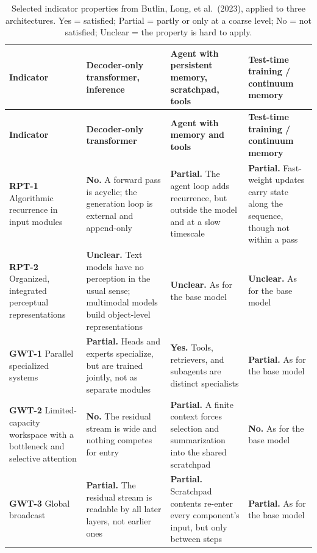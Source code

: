\documentclass[11pt,letterpaper]{article}
\begin{document}
{\footnotesize
\setlength{\tabcolsep}{4pt}
\begin{longtable}{L{2.7cm}L{4.35cm}L{4.35cm}L{4.35cm}}
\caption{Selected indicator properties from Butlin, Long, et al.\ (2023), applied to three architectures. Yes = satisfied; Partial = partly or only at a coarse level; No = not satisfied; Unclear = the property is hard to apply.}\label{tab:indicators}\\
\toprule
\textbf{Indicator} & \textbf{Decoder-only transformer, inference} & \textbf{Agent with persistent memory, scratchpad, tools} & \textbf{Test-time training / continuum memory} \\
\midrule
\endfirsthead
\toprule
\textbf{Indicator} & \textbf{Decoder-only transformer} & \textbf{Agent with memory and tools} & \textbf{Test-time training / continuum memory} \\
\midrule
\endhead
\bottomrule
\endfoot
{}
\textbf{RPT-1} Algorithmic recurrence in input modules & \textbf{No.} A forward pass is acyclic; the generation loop is external and append-only & \textbf{Partial.} The agent loop adds recurrence, but outside the model and at a slow timescale & \textbf{Partial.} Fast-weight updates carry state along the sequence, though not within a pass \\
\textbf{RPT-2} Organized, integrated perceptual representations & \textbf{Unclear.} Text models have no perception in the usual sense; multimodal models build object-level representations & \textbf{Unclear.} As for the base model & \textbf{Unclear.} As for the base model \\
\textbf{GWT-1} Parallel specialized systems & \textbf{Partial.} Heads and experts specialize, but are trained jointly, not as separate modules & \textbf{Yes.} Tools, retrievers, and subagents are distinct specialists & \textbf{Partial.} As for the base model \\
\textbf{GWT-2} Limited-capacity workspace with a bottleneck and selective attention & \textbf{No.} The residual stream is wide and nothing competes for entry & \textbf{Partial.} A finite context forces selection and summarization into the shared scratchpad & \textbf{No.} As for the base model \\
\textbf{GWT-3} Global broadcast & \textbf{Partial.} The residual stream is readable by all later layers, not earlier ones & \textbf{Partial.} Scratchpad contents re-enter every component's input, but only between steps & \textbf{Partial.} As for the base model \\

\end{longtable}}
\end{document}
